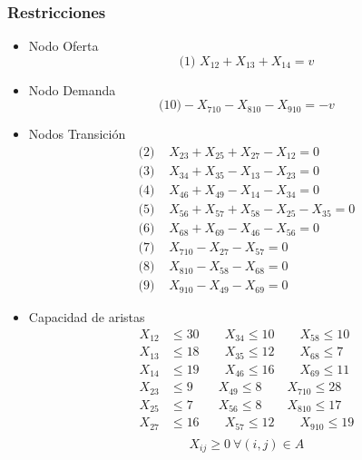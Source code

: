 \documentclass[a4paper,12pt]{article}
\begin{document}
\subsubsection{Restricciones}
\begin{itemize}
	\item Nodo Oferta
		\begin{equation*}
		\text{(1) }	X_{12}+X_{13}+X_{14}=v	
		\end{equation*}
	\item Nodo Demanda
		\begin{equation*}
		\text{(10)}	-X_{710}-X_{810}-X_{910}=-v
		\end{equation*}
	\item Nodos Transición
		\begin{equation*}
		\begin{split}
			\text{(2) }&X_{23}+X_{25}+X_{27}-X_{12}=0\\
			\text{(3) }&X_{34}+X_{35}-X_{13}-X_{23}=0\\
			\text{(4) }&X_{46}+X_{49}-X_{14}-X_{34}=0\\
			\text{(5) }&X_{56}+X_{57}+X_{58}-X_{25}-X_{35}=0\\
			\text{(6) }&X_{68}+X_{69}-X_{46}-X_{56}=0\\
			\text{(7) }&X_{710}-X_{27}-X_{57}=0\\
			\text{(8) }&X_{810}-X_{58}-X_{68}=0\\
			\text{(9) }&X_{910}-X_{49}-X_{69}=0
		\end{split}
		\end{equation*}
		\item Capacidad de aristas
		\begin{equation*}
		\begin{split}
			X_{12}&\leq 30 \qquad X_{34}\leq 10 \qquad X_{58}\leq 10\\
			X_{13}&\leq 18 \qquad X_{35}\leq 12 \qquad X_{68}\leq 7\\
			X_{14}&\leq 19 \qquad X_{46}\leq 16 \qquad X_{69}\leq 11\\
			X_{23}&\leq 9 \qquad X_{49}\leq 8 \qquad X_{710}\leq 28\\
			X_{25}&\leq 7 \qquad X_{56}\leq 8 \qquad X_{810}\leq 17\\
			X_{27}&\leq 16 \qquad X_{57}\leq 12 \qquad X_{910}\leq 19\\
		\end{split}
		\end{equation*}
		\begin{equation*}
			X_{ij}\geq 0\ \forall(i,j)\in A
		\end{equation*}
\end{itemize}
\end{document}
